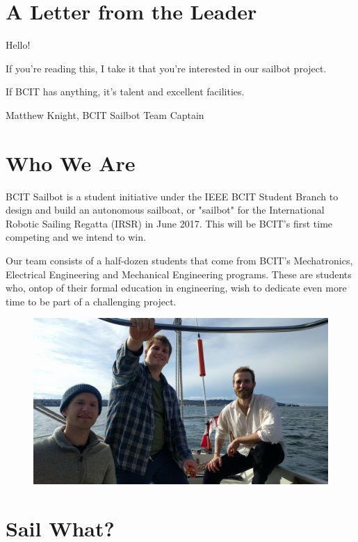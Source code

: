 \documentclass{article}
\begin{document}


\section*{A Letter from the Leader}

Hello!

If you're reading this, I take it that you're interested in our sailbot project.

If BCIT has anything, it's talent and excellent facilities. 


Matthew Knight,
BCIT Sailbot Team Captain

\section*{Who We Are}

BCIT Sailbot is a student initiative under the IEEE BCIT Student Branch to 
design and build an autonomous sailboat, or "sailbot" for the International 
Robotic Sailing Regatta (IRSR) in June 2017. This will be BCIT's first time 
competing and we intend to win. 

Our team consists of a half-dozen students that come from BCIT's Mechatronics,
Electrical Engineering and Mechanical Engineering programs. These are students 
who, ontop of their formal education in engineering, wish to dedicate even more 
time to be part of a challenging project. 

\begin{figure}[H]
    \centering
    \includegraphics[scale=0.1]{Sailing.jpg}
\end{figure}

\newpage

\section*{Sail What?}
\end{document}
